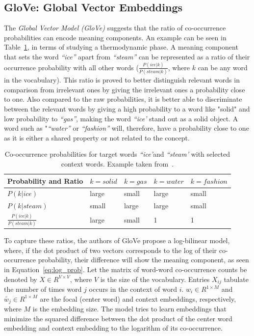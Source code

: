 \subsection{GloVe: Global Vector Embeddings}
\label{subsec:GloVe}
The \emph{Global Vector Model (GloVe)} suggests that the ratio of co-occurrence probabilities can encode meaning components. An example can be seen in Table~\ref{table:tab_1}, in terms of studying a thermodynamic phase. A meaning component that sets the word \emph{``ice''} apart from \emph{``steam''} can be represented as a ratio of their occurrence probability with all other words \big($\frac { P(ice|k) }{ P(steam|k) } $, where $k$ can be any word in the vocabulary\big). This ratio is proved to better distinguish relevant words in comparison from irrelevant ones by giving the irrelevant ones a probability close to one. Also compared to the raw probabilities, it is better able to discriminate between the relevant words by giving a high probability to a word like "solid" and low probability to \emph{``gas''}, making the word \emph{``ice'} stand out as a solid object. A word such as "\emph{``water''} or \emph{``fashion''} will, therefore, have a probability close to one as it is either a shared property or not related to the concept.\\
\begin{table}[]
\centering

\begin{tabular}{@{}l|l|l|l|l@{}}
\toprule
Probability and Ratio &  $k=solid$& $k=gas$ & $k=water$ &$k= fashion$  \\ \midrule $P(k|ice)$& {\color[HTML]{CB0000}large} &  {\color[HTML]{329A9D}small} & {\color[HTML]{CB0000}large} & {\color[HTML]{329A9D}small} \\\midrule
  $P(k|steam)$&{\color[HTML]{329A9D}small}  & {\color[HTML]{CB0000}large} &  {\color[HTML]{CB0000}large}&{\color[HTML]{329A9D}small}  \\\midrule
 $\frac { P(ice|k) }{ P(steam|k) } $& {\color[HTML]{CB0000}large} &  {\color[HTML]{329A9D}small}&  1 &    1  \\\midrule
\end{tabular}%
\caption{Co-occurrence probabilities for target words \emph{``ice'}and \emph{``steam'} with selected context words. Example taken from~.}
\label{table:tab_1}
\end{table}
\noindent
To capture these ratios, the authors of GloVe propose a log-bilinear model, where, if the dot product of two vectors corresponds to the log of their co-occurrence probability, their difference will show the meaning component, as seen in Equation~\ref{eq:log_prob}. Let the matrix of word-word co-occurrence counts be denoted by $X\in { R }^{ V\times V }$, where $V$ is the size of the vocabulary. Entries $X_{ij}$ tabulate the number of times word $j$ occurs in the context of word $i$. $w_{ i }\in { R }^{ 1\times M }$ and $\tilde{w_{ j }}\in { R }^{ 1\times M }$ are the focal (center word) and context embeddings, respectively, where $M$ is the embedding size. The model tries to learn embeddings that minimize the squared difference between the dot product of the center word embedding and context embedding to the logarithm of its co-occurrence.
